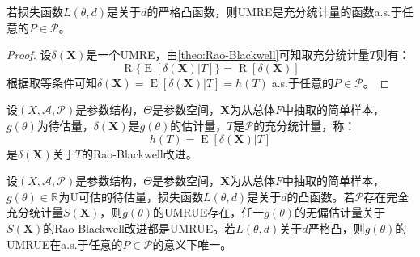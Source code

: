 \begin{corollary}\label{cor:Rao-Blackwell}
	若损失函数$L(\theta,d)$是关于$d$的严格凸函数，则UMRE是充分统计量的函数a.s.于任意的$P\in\mathscr{P}$。
\end{corollary}
\begin{proof}
	设$\delta(\mathbf{X})$是一个UMRE，由\cref{theo:Rao-Blackwell}可知取充分统计量$T$则有：
	\begin{equation*}
		\operatorname{R}\{\operatorname{E}[\delta(\mathbf{X})|T]\}=\operatorname{R}[\delta(\mathbf{X})]
	\end{equation*}
	根据取等条件可知$\delta(\mathbf{X})=\operatorname{E}[\delta(\mathbf{X})|T]=h(T)\;$a.s.于任意的$P\in\mathscr{P}$。
\end{proof}
\begin{definition}
	设$(X,\mathscr{A},\mathscr{P})$是参数结构，$\Theta$是参数空间，$\mathbf{X}$为从总体$F$中抽取的简单样本，$g(\theta)$为待估量，$\delta(\mathbf{X})$是$g(\theta)$的估计量，$T$是$\mathscr{P}$的充分统计量，称：
	\begin{equation*}
		h(T)=\operatorname{E}[\delta(\mathbf{X})|T]
	\end{equation*}
	是$\delta(\mathbf{X})$关于$T$的Rao-Blackwell改进。
\end{definition}
\begin{theorem}
	\label{theo:Lehmann-Scheffe}
	设$(X,\mathscr{A},\mathscr{P})$是参数结构，$\Theta$是参数空间，$\mathbf{X}$为从总体$F$中抽取的简单样本，$g(\theta)\in\mathbb{R}^{}$为U可估的待估量，损失函数$L(\theta,d)$是关于$d$的凸函数。若$\mathscr{P}$存在完全充分统计量$S(\mathbf{X})$，则$g(\theta)$的UMRUE存在，任一$g(\theta)$的无偏估计量关于$S(\mathbf{X})$的Rao-Blackwell改进都是UMRUE。若$L(\theta,d)$关于$d$严格凸，则$g(\theta)$的UMRUE在a.s.于任意的$P\in\mathscr{P}$的意义下唯一。
\end{theorem}
